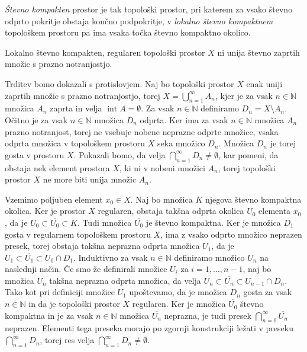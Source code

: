 \documentclass[mat1]{fmfdelo}
\newcommand{\N}{\mathbb N}
\newcommand{\closure}[1]{\overline{#1}}
\DeclareMathOperator{\interior}{int}
\begin{document}
\begin{opomba}
\emph{Števno kompakten} prostor je tak topološki prostor, pri katerem za vsako števno odprto pokritje obstaja končno podpokritje, v \emph{lokalno števno kompaktnem} topološkem prostoru pa ima vsaka točka števno kompaktno okolico. 
\end{opomba}

\begin{trditev}\label{trd:kompni}
Lokalno števno kompakten, regularen topološki prostor $X$ ni unija števno zaprtih množic s prazno notranjostjo.
\end{trditev}

\begin{dokaz}
Trditev bomo dokazali s protislovjem. Naj bo topološki prostor $X$ enak uniji zaprtih množic s prazno notranjostjo, torej $X = \bigcup_{n=1}^\infty A_n$, kjer je za vsak $n \in \N$ množica $A_n$ zaprta in velja $\interior{A} = \emptyset$. Za vsak $n \in \N$ definiramo $D_n = X \setminus A_n$. Očitno je za vsak $n \in \N$ množica $D_n$ odprta. Ker ima za vsak $n \in \N$ množica $A_n$ prazno notranjost, torej ne vsebuje nobene neprazne odprte množice, vsaka odprta množica v topološkem prostoru $X$ seka množico $D_n$. Množica $D_n$ je torej gosta v prostoru $X$. Pokazali bomo, da velja $\bigcap_{n=1}^\infty D_n \neq \emptyset$, kar pomeni, da obstaja nek element prostora $X$, ki ni v nobeni množici $A_n$, torej topološki prostor $X$ ne more biti unija množic $A_n$.

Vzemimo poljuben element $x_0 \in X$. Naj bo množica $K$ njegova števno kompaktna okolica. Ker je prostor $X$ regularen, obstaja takšna odprta okolica $U_0$ elementa $x_0$, da je $U_0 \subset \closure{U_0} \subset K$. Tudi množica $\closure{U_0}$ je števno kompaktna. Ker je množica $D_1$ gosta v regularnem topološkem prostoru $X$, ima z vsako odprto množico neprazen presek, torej obstaja takšna neprazna odprta množica $U_1$, da je $U_1 \subset \closure{U_1} \subset U_0 \cap D_1$. Induktivno za vsak $n \in \N$ definiramo množico $U_n$ na naslednji način. Če smo že definirali množice $U_i$ za $i = 1,\dots,n-1$, naj bo množica $U_n$ takšna neprazna odprta množica, da velja $U_n \subset \closure{U_n} \subset U_{n-1} \cap D_n$. Tako kot pri definiciji množice $U_1$ upoštevamo, da je množica $D_n$ gosta za vsak $n \in \N$ in da je topološki prostor $X$ regularen.
Ker je množica $\closure{U_0}$ števno kompaktna in je za vsak $n \in \N$ množica $\closure{U_n}$ neprazna, je tudi presek $\bigcap_{n=0}^\infty \closure{U_n}$ neprazen. Elementi tega preseka morajo po zgornji konstrukciji ležati v preseku $\bigcap_{n=1}^\infty D_n$, torej res velja $\bigcap_{n=1}^\infty D_n \neq \emptyset$.
\end{dokaz}
\end{document}
